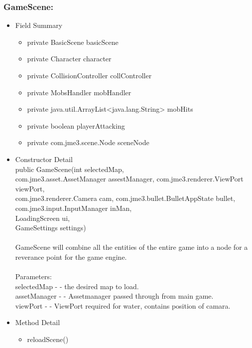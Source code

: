 \documentclass[letterpaper]{article}
\begin{document}
				\subsubsection*{GameScene:}
				\vspace{0.1in}
					\begin{itemize}
						\item	Field Summary
								\begin{itemize}
									\item	private BasicScene	basicScene 
									\item	private Character	character 
									\item	private CollisionController	collController 
									\item	private MobsHandler	mobHandler 
									\item	private java.util.ArrayList<java.lang.String>	mobHits 
									\item	private boolean	playerAttacking 
									\item	private com.jme3.scene.Node	sceneNode  
								\end{itemize}
						\item	Constructor Detail \\
								public GameScene(int selectedMap, \\ com.jme3.asset.AssetManager assestManager, com.jme3.renderer.ViewPort viewPort, \\ com.jme3.renderer.Camera cam, com.jme3.bullet.BulletAppState bullet, \\ com.jme3.input.InputManager inMan, \\ LoadingScreen ui, \\ GameSettings settings) \\ \\
								GameScene will combine all the entities of the entire game into a node for a reverance point for the game engine. \\ \\
								Parameters: \\
								selectedMap - - the desired map to load. \\
								assetManager - - Assetmanager passed through from main game. \\
								viewPort - - ViewPort required for water, contains position of camara.
						\item	Method Detail
								\begin{itemize}
									\item	reloadScene() \\

\end{itemize}
\end{itemize}
\end{document}
